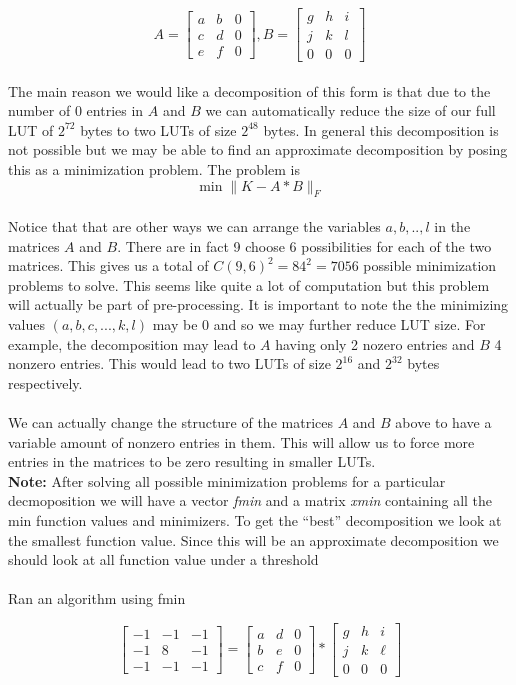\documentclass[12pt]{amsart}
\theoremstyle{definition}
\theoremstyle{remark}
\numberwithin{thm}{section}
\begin{document}
$$
A
=
\begin{bmatrix}
a & b & 0\\
c & d & 0\\
e & f & 0
\end{bmatrix}
,
B=
\begin{bmatrix}
g & h & i\\
j & k & l\\
0 & 0 & 0
\end{bmatrix}$$
\\
The main reason we would like a decomposition of this form is that due to the number of 0 entries in $A$ and $B$ we can automatically reduce the size of our full LUT of $2^{72}$ bytes to two LUTs of size $2^{48}$ bytes. In general this decomposition is not possible but we may be able to find an approximate decomposition by posing this as a minimization problem. The problem is 
$$\min \|K-A*B\|_F$$
\\
Notice that that are other ways we can arrange the variables $a,b,..,l$ in the matrices $A$ and $B$. There are in fact 9 choose 6 possibilities for each of the two matrices. This gives us a total of  $C(9,6)^2 =84^2= 7056$ possible minimization problems to solve. This seems like quite a lot of computation but this problem will actually be part of pre-processing. It is important to note the the minimizing values $(a,b,c,...,k,l)$ may be 0 and so we may further reduce LUT size. For example, the decomposition may lead to $A$ having only 2 nozero entries and $B$ 4 nonzero entries. This would lead to two LUTs of size $2^{16}$ and $2^{32}$ bytes respectively.
\\
\\We can actually change the structure of the matrices $A$ and $B$ above to have a variable amount of nonzero entries in them. This will allow us to force more entries in the matrices to be zero resulting in smaller LUTs. 
\\
\textbf{Note:} After solving all possible minimization problems for a particular decmoposition we will have a vector \textit{fmin} and a matrix \textit{xmin} containing all the min function values and minimizers. To get the ``best'' decomposition we look at the smallest function value. Since this will be an approximate decomposition we should look at all function value under a threshold
\\
\\Ran an algorithm using fmin

$$
\begin{bmatrix}
-1 & -1 & -1\\
-1 & 8 & -1\\
-1 & -1 & -1
\end{bmatrix}
=
\begin{bmatrix}
a & d & 0\\
b & e & 0\\
c & f & 0
\end{bmatrix} *
\begin{bmatrix}
g & h & i\\
j & k & \ell \\
0 & 0 & 0
\end{bmatrix}
$$
\end{document}
